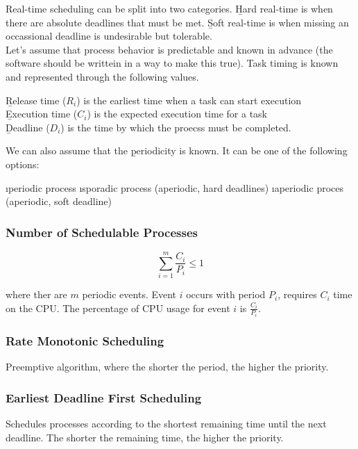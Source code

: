 \documentclass{article}
\begin{document}
    \noindent Real-time scheduling can be split into two categories. \b{Hard real-time} is when there are absolute deadlines that must be met. \b{Soft real-time} is when missing an occassional deadline is undesirable but tolerable. \\ 

    \noindent Let's assume that process behavior is predictable and known in advance (the software should be writtein in a way to make this true). Task timing is known and represented through the following values. 
    
    \begin{center}
        \b{Release time} ($R_i$) is the earliest time when a task can start execution \\
        \b{Execution time} ($C_i$) is the expected execution time for a task \\ 
        \b{Deadline} ($D_i$) is the time by which the proecss must be completed. 
    \end{center}

    \noindent We can also assume that the \b{periodicity} is known. It can be one of the following options:

    \bl 
    \i periodic process
    \i sporadic process (aperiodic, hard deadlines)
    \i aperiodic proces (aperiodic, soft deadline)
    \el

    \subsubsection{Number of Schedulable Processes}

    $$\sum_{i=1}^{m} \frac{C_i}{P_i} \leq 1$$

    \noindent where ther are $m$ periodic events. Event $i$ occurs with period $P_i$, requires $C_i$ time on the CPU. The percentage of CPU usage for event $i$ is $\frac{C_i}{P_i}$. 

    \subsubsection{Rate Monotonic Scheduling}

    Preemptive algorithm, where the shorter the period, the higher the priority.

    \subsubsection{Earliest Deadline First Scheduling}

    Schedules processes according to the shortest remaining time until the next deadline. The shorter the remaining time, the higher the priority. 
\end{document}
